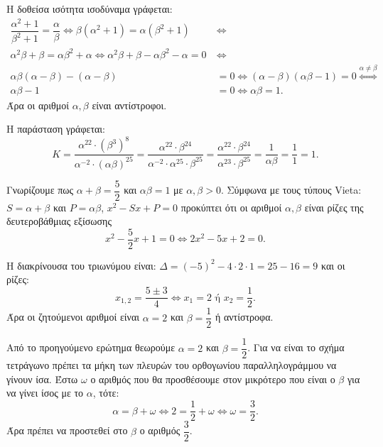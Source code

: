
\begin{alist}
\item Η δοθείσα ισότητα ισοδύναμα γράφεται:
\begin{align*}
\dfrac{\alpha^2 + 1}{\beta^2 + 1} = \dfrac{\alpha}{\beta} \Leftrightarrow \beta(\alpha^2 + 1) = \alpha(\beta^2 + 1) \ &\Leftrightarrow \\
\alpha^2\beta + \beta = \alpha\beta^2 + \alpha \Leftrightarrow \alpha^2\beta + \beta - \alpha\beta^2 - \alpha = 0 \ &\Leftrightarrow \\
\alpha\beta(\alpha - \beta) - (\alpha - \beta) &= 0 \Leftrightarrow (\alpha - \beta)(\alpha\beta - 1) = 0 \stackrel{\alpha \ne \beta}{\Leftrightarrow} \\
\alpha\beta - 1 &= 0 \Leftrightarrow \alpha\beta = 1.
\end{align*}
Άρα οι αριθμοί $\alpha, \beta$ είναι αντίστροφοι.

\item Η παράσταση γράφεται:
\[K = \dfrac{\alpha^{22} \cdot (\beta^3)^8}{\alpha^{-2} \cdot (\alpha\beta)^{25}} = \dfrac{\alpha^{22} \cdot \beta^{24}}{\alpha^{-2} \cdot \alpha^{25} \cdot \beta^{25}} = \dfrac{\alpha^{22} \cdot \beta^{24}}{\alpha^{23} \cdot \beta^{25}} = \dfrac{1}{\alpha \beta} = \dfrac{1}{1} = 1.\]

\item Γνωρίζουμε πως $\alpha + \beta = \dfrac{5}{2}$ και $\alpha\beta = 1$ με $\alpha, \beta > 0$. Σύμφωνα με τους τύπους Vieta:
$S = \alpha + \beta$ και $P = \alpha\beta$, $x^2 - Sx + P = 0$
προκύπτει ότι οι αριθμοί $\alpha, \beta$ είναι ρίζες της δευτεροβάθμιας εξίσωσης
\[x^2 - \dfrac{5}{2}x + 1 = 0 \Leftrightarrow 2x^2 - 5x + 2 = 0.\]

Η διακρίνουσα του τριωνύμου είναι: $\Delta = (-5)^2 - 4 \cdot 2 \cdot 1 = 25 - 16 = 9$ και οι ρίζες:
\[x_{1,2} = \dfrac{5 \pm 3}{4} \Leftrightarrow x_1 = 2 \text{ ή } x_2 = \dfrac{1}{2}.\]
Άρα οι ζητούμενοι αριθμοί είναι $\alpha = 2$ και $\beta = \dfrac{1}{2}$ ή αντίστροφα.

\item Από το προηγούμενο ερώτημα θεωρούμε $\alpha = 2$ και $\beta = \dfrac{1}{2}$. Για να είναι το σχήμα τετράγωνο
πρέπει τα μήκη των πλευρών του ορθογωνίου παραλληλογράμμου να γίνουν ίσα. Έστω $\omega$ ο
αριθμός που θα προσθέσουμε στον μικρότερο που είναι ο $\beta$ για να γίνει ίσος με το $\alpha$, τότε:
\[\alpha = \beta + \omega \Leftrightarrow 2 = \dfrac{1}{2} + \omega \Leftrightarrow \omega = \dfrac{3}{2}.\]
Άρα πρέπει να προστεθεί στο $\beta$ ο αριθμός $\dfrac{3}{2}$.
\end{alist}


